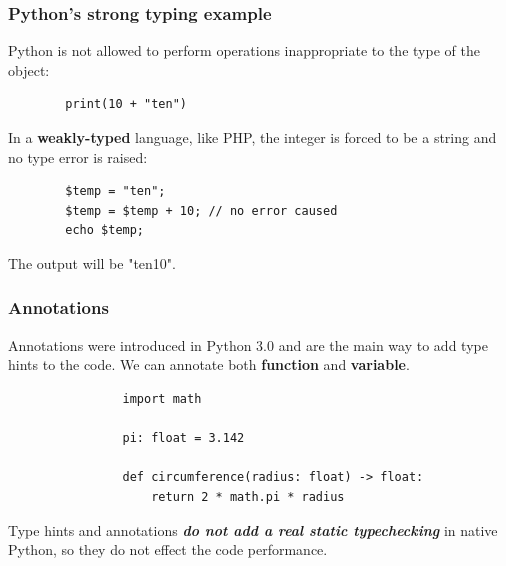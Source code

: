 \documentclass[xcolor ={table,usenames,dvipsnames}]{beamer}
\theoremstyle{definition}
\begin{document}
	\begin{frame}[fragile]
		\frametitle{Python's strong typing example}
		Python is not allowed to perform operations inappropriate to the type of the object: 
		\begin{lstlisting}
		print(10 + "ten")
		\end{lstlisting}
		
		In a \textbf{weakly-typed} language, like PHP, the integer is forced to be a string and no type error is raised:
		\begin{lstlisting}
		$temp = "ten"; 
		$temp = $temp + 10; // no error caused
		echo $temp;
		\end{lstlisting}
	The output will be "ten10".
	\end{frame}

%		

%		
%		
		
%		

	\begin{frame}[fragile]
		\frametitle{Annotations}
			Annotations were introduced in Python 3.0 and are the main way to add type hints to the code. We can annotate both \textbf{function} and \textbf{variable}.
			
			\begin{lstlisting}
				import math
				
				pi: float = 3.142
				
				def circumference(radius: float) -> float:
					return 2 * math.pi * radius
			\end{lstlisting}
			
			Type hints and annotations \textbf{\textit{do not add a real static typechecking}} in native Python, so they do not effect the code performance.\\
	\end{frame}
\end{document}

